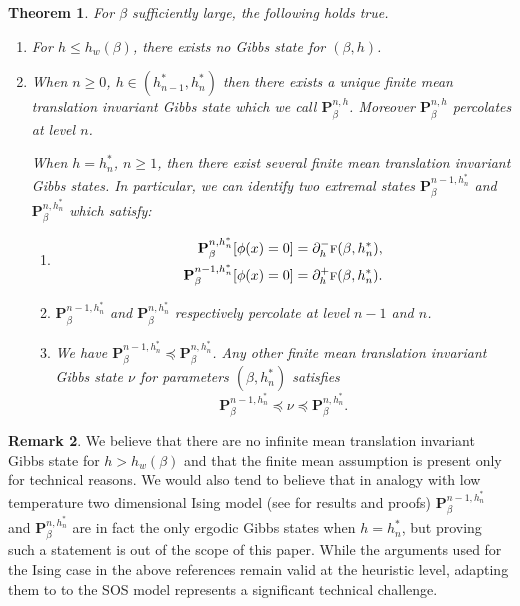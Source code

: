 \documentclass[10pt]{amsart}
\newenvironment{enumeratei}
{\bgroup\def\theenumi{\roman{enumi}}\def\theenumii{\Alph{enumii}}\begin{enumerate}}
{\end{enumerate}\egroup}
\numberwithin{equation}{section}
\theoremstyle{plain}
\newtheorem{theorem}{Theorem}[section]
\theoremstyle{definition}
\newtheorem{rem}[theorem]{Remark}
\newcommand{\bP}{{\ensuremath{\mathbf P}} }
\newcommand{\gb}{\beta}
\newcommand{\tf}{\textsc{f}}
\begin{document}
\begin{theorem}\label{Gibbs}
For $\gb$ sufficiently large, the following holds true.
\begin{enumeratei}
\item
For $h\le h_w(\gb)$, there exists no Gibbs state for $(\gb,h)$.
\item
When $n\ge 0$, $h\in (h^*_{n-1},h^*_{n})$ then there exists a unique finite mean translation invariant Gibbs state
which we call $\bP^{n,h}_{\gb}$.
Moreover $\bP^{n,h}_{\gb}$ percolates at level $n$.

When $h=h^*_n$, $n\ge 1$, then there exist several finite mean translation invariant Gibbs states.
In particular, we can identify two extremal states $\bP^{n-1,h^*_n}_{\gb}$ and $\bP^{n,h^*_n}_{\gb}$ which satisfy:
\begin{enumeratei}
\item\mbox{}\vspace*{-10pt}
\begin{equation}\label{variousgibbs}
\begin{split}
\bP^{n,h^*_n}_{\gb}[\phi(x)=0]&= \partial^-_h\tf(\gb,h^*_n), \\
\bP^{n-1,h^*_n}_{\gb}[\phi(x)=0]&= \partial^+_h\tf(\gb,h^*_n).
\end{split}
\end{equation}
\item
$\bP^{n-1,h^*_n}_{\gb}$ and $\bP^{n,h^*_n}_{\gb}$ respectively percolate at level $n-1$ and $n$.
\item
We have $\bP^{n-1,h^*_n}_{\gb}\preccurlyeq \bP^{n,h^*_n}_{\gb}$. Any other finite mean translation invariant Gibbs state $\nu$
for parameters $(\gb,h^*_n)$ satisfies
\begin{equation}\label{ssanduba}
\bP^{n-1,h^*_n}_{\gb}\preccurlyeq \nu \preccurlyeq \bP^{n,h^*_n}_{\gb}.
\end{equation}
\end{enumeratei}
\end{enumeratei}
\end{theorem}


\begin{rem}
We believe that there are no infinite mean translation invariant Gibbs state for $h>h_w(\gb)$ and that the finite mean assumption is present only for technical reasons.
We would also tend to believe that in analogy with low temperature two dimensional Ising model (see \cite{cf:A, cf:CoV, cf:H} for results and proofs)
$\bP^{n-1,h^*_n}_{\gb}$ and $\bP^{n,h^*_n}_{\gb}$ are in fact the only
ergodic Gibbs states when $h=h^*_n$, but proving such a statement is out of the scope of this paper. While the arguments used for the Ising case in the above references remain valid at the heuristic level, adapting them to to the SOS model represents a significant technical challenge.
\end{rem}
\end{document}
